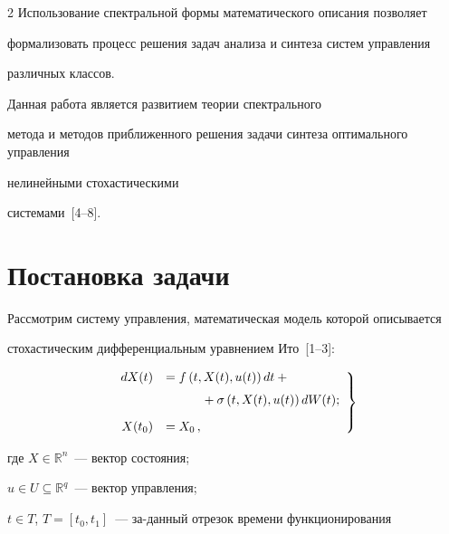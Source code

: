 \begin{multicols}{2}
Использование спектральной формы математического описания позволяет 


формализовать процесс решения задач анализа и синтеза систем управ\-ле\-ния 


различных классов. 





Данная работа является развитием теории спектрального


метода и методов приближенного решения задачи синтеза оптимального управления 


нелинейными стохастическими 


сис\-те\-ма\-ми~[4--8].





\section{Постановка задачи}





Рассмотрим систему управления, математическая модель которой описывается 


стохастическим дифференциальным уравнением Ито~[1--3]:


\begin{equation}


\label{eqIto}


\left.


\begin{array}{rl}


dX(t) &=f \left( t,X(t),u(t) \right) dt +{}\\[6pt]


&\hspace*{10mm}{}+ \sigma \left( t,X(t),u(t) \right) dW(t); \\[9pt]


X(t_0) &= X_0\,,


\end{array}


\right\}


\end{equation}


где ${X \in \mathbb{R}^n}$~--- вектор состояния; 


${u \in U \subseteq \mathbb{R}^q}$~--- вектор управ\-ле\-ния;


${t \in T}$, ${T = [t_0, t_1]}$~--- за-\linebreak данный отрезок времени функционирования\linebreak



\end{multicols}

